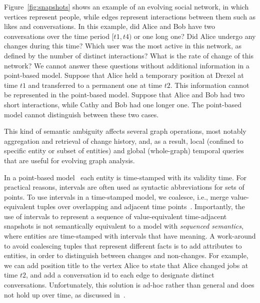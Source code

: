 Figure~\ref{fig:snapshots} shows an example of an evolving social
network, in which vertices represent people, while edges represent
interactions between them such as likes and conversations.  In this
example, did Alice and Bob have two conversations over the time period
$[t1, t4)$ or one long one?  Did Alice undergo any changes during this
  time?  Which user was the most active in this network, as defined by
  the number of distinct interactions? What is the rate of change of
  this network?  We cannot answer these questions without additional
  information in a point-based model.  Suppose that Alice held a
  temporary position at Drexel at time $t1$ and transferred to a
  permanent one at time $t2$.  This information cannot be represented
  in the point-based model.  Suppose that Alice and Bob had two short
  interactions, while Cathy and Bob had one longer one.  The
  point-based model cannot distinguish between these two cases.

This kind of semantic ambiguity affects several graph operations, most
notably aggregation and retrieval of change history, and, as a result,
local (confined to specific entity or subset of entities) and global
(whole-graph) temporal queries that are useful for evolving graph
analysis.

In a point-based model~\cite{Toman2009} each entity is time-stamped
with its validity time.  For practical reasons, intervals are often
used as syntactic abbreviations for sets of points.  To use intervals
in a time-stamped model, we coalesce, i.e., merge value-equivalent
tuples over overlapping and adjacent time
points~\cite{DBLP:conf/vldb/BohlenSS96}.
%
Importantly, the use of intervals to represent a sequence of
value-equivalent time-adjacent snapshots is not semantically
equivalent to a model with {\em sequenced semantics}, where entities
are time-stamped with intervals that have meaning.\eat{ Note that
  Alice shows no changes during the whole time interval, with a single
  tuple over $[t1, t4)$.  Similarly, two interactions between Alice
    and Bob are coalesced into one.} A work-around to avoid coalescing
  tuples that represent different facts is to add attributes to
  entities, in order to distinguish between changes and non-changes.
  For example, we can add position title to the vertex Alice to state
  that Alice changed jobs at time $t2$, and add a conversation id to
  each edge to designate distinct conversations.  Unfortunately, this
  solution is ad-hoc rather than general and does not hold up over
  time, as discussed in~\cite{Bohlen1998}.

